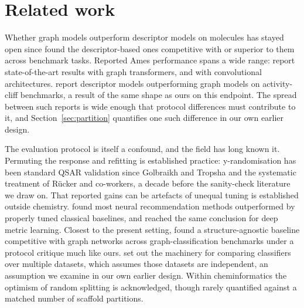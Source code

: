 \documentclass[journal=jcisd8,manuscript=article]{achemso}
\begin{document}
\section{Related work}

Whether graph models outperform descriptor models on molecules has stayed open since
\citet{jiang2021} found the descriptor-based ones competitive with or superior to them
across benchmark tasks. Reported Ames performance
spans a wide range: \citet{thompson2025amesformer} report state-of-the-art results with graph
transformers, \citet{monem2025enhanced} and \citet{li2021mutagenpred} with convolutional
architectures. \citet{vantilborg2022} report descriptor models outperforming graph models on
activity-cliff benchmarks, a result of the same shape as ours on this endpoint. The spread
between such reports is wide enough that protocol differences must contribute to it, and Section~\ref{sec:partition} quantifies one
such difference in our own earlier design.

The evaluation protocol is itself a confound, and the field has long known it. Permuting the
response and refitting is established practice: y-randomisation has
been standard QSAR validation since Golbraikh and Tropsha\cite{golbraikh2002} and the
systematic treatment of Rücker and co-workers,\cite{rucker2007} a decade before the
sanity-check literature we draw on. That reported gains can be artefacts of unequal tuning is
established outside chemistry.
\citet{dacrema2019} found most neural recommendation methods outperformed by properly tuned
classical baselines, and \citet{musgrave2020} reached the same conclusion for deep metric
learning. Closest to the present setting, \citet{errica2020} found a structure-agnostic
baseline competitive with graph networks across graph-classification benchmarks under a
protocol critique much like ours. \citet{demsar2006} set out the machinery for comparing classifiers over multiple
datasets, which assumes those datasets are independent, an assumption we examine in our own
earlier design. Within cheminformatics the optimism of random splitting is
acknowledged,\cite{sheridan2013,wu2018moleculenet} though rarely quantified against a matched
number of scaffold partitions.
\end{document}

